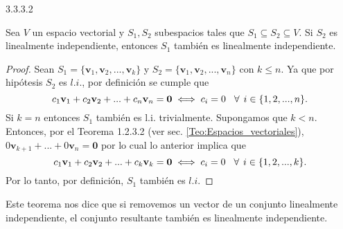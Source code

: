 \documentclass[apuntes]{subfiles}
\begin{document}
\begin{teo} {3.3.3.2} 

    Sea $V$ un espacio vectorial y $S_1,S_2$ subespacios tales que $S_1\subseteq S_2\subseteq V$. Si $S_2$ es linealmente independiente, entonces $S_1$ también es linealmente independiente.

\begin{proof}

    Sean $S_1=\{\mathbf{v}_1,\mathbf{v}_2, ..., \mathbf{v}_k\}$ y $S_2=\{\mathbf{v}_1,\mathbf{v}_2, ..., \mathbf{v}_n\}$ con $k\leq n$. Ya que por hipótesis $S_2$ es $l.i.$, por definición se cumple que $$c_1\mathbf{v}_1+c_2\mathbf{v}_2+...+c_n\mathbf{v}_n=\mathbf{0}\iff c_i=0\hspace{3mm}\forall\hspace{1.5mm}  i\in\{1,2, ..., n\}.$$ Si $k=n$ entonces $S_1$ también es l.i. trivialmente. Supongamos que $k<n$. Entonces, por el Teorema 1.2.3.2 (ver sec. \ref{Teo:Espacios_vectoriales}), $0\mathbf{v}_{k+1}+...+0\mathbf{v}_n=\mathbf{0}$ por lo cual lo anterior implica que $$c_1\mathbf{v}_1+c_2\mathbf{v}_2+...+c_k\mathbf{v}_k=\mathbf{0}\iff c_i=0\hspace{3mm}\forall\hspace{1.5mm}  i\in\{1,2, ...,k\}.$$ Por lo tanto, por definición, $S_1$ también es $l.i$.

\end{proof}

Este teorema nos dice que si removemos un vector de un conjunto linealmente independiente, el conjunto resultante también es linealmente independiente.

\end{teo}
\end{document}
